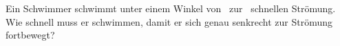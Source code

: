 Ein Schwimmer schwimmt unter einem Winkel von \alO\ zur \vstO\ schnellen Strömung. Wie schnell muss er schwimmen, damit er sich genau senkrecht zur Strömung fortbewegt?
